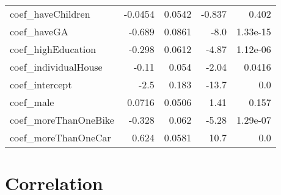 \begin{tabular}{lrrrr}
coef_haveChildren & -0.0454 & 0.0542 & -0.837 & 0.402 \\
coef_haveGA & -0.689 & 0.0861 & -8.0 & 1.33e-15 \\
coef_highEducation & -0.298 & 0.0612 & -4.87 & 1.12e-06 \\
coef_individualHouse & -0.11 & 0.054 & -2.04 & 0.0416 \\
coef_intercept & -2.5 & 0.183 & -13.7 & 0.0 \\
coef_male & 0.0716 & 0.0506 & 1.41 & 0.157 \\
coef_moreThanOneBike & -0.328 & 0.062 & -5.28 & 1.29e-07 \\
coef_moreThanOneCar & 0.624 & 0.0581 & 10.7 & 0.0 \\
\end{tabular}

\section{Correlation}
